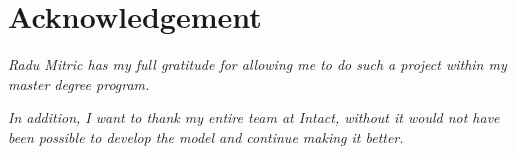 \section*{Acknowledgement}
\begin{center}
	\vspace{8cm}
	
	\textit{Radu Mitric has my full gratitude for allowing me to do such a project within my master degree program.} \\
	\vspace{0.5cm}
	
	\textit{In addition, I want to thank my entire team at Intact, without it would not have been possible to develop the model and continue making it better.}
\end{center}